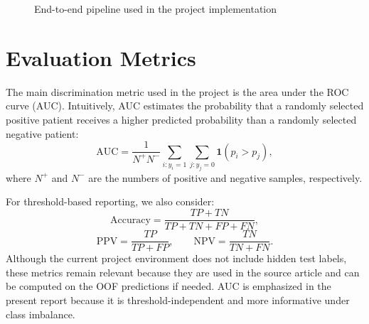\documentclass[a4paper,12pt]{extreport}
\begin{document}
\begin{figure}[H]
    \centering
    \caption{End-to-end pipeline used in the project implementation}
    \label{fig:pipeline}
\end{figure}

\section{Evaluation Metrics}
The main discrimination metric used in the project is the area under the ROC curve (AUC). Intuitively, AUC estimates the probability that a randomly selected positive patient receives a higher predicted probability than a randomly selected negative patient:
\[
\mathrm{AUC} = \frac{1}{N^{+}N^{-}} \sum_{i:y_i=1}\sum_{j:y_j=0}\mathbf{1}(p_i > p_j),
\]
where \(N^{+}\) and \(N^{-}\) are the numbers of positive and negative samples, respectively.

For threshold-based reporting, we also consider:
\[
\mathrm{Accuracy} = \frac{TP + TN}{TP + TN + FP + FN},
\]
\[
\mathrm{PPV} = \frac{TP}{TP + FP}, \qquad
\mathrm{NPV} = \frac{TN}{TN + FN}.
\]
Although the current project environment does not include hidden test labels, these metrics remain relevant because they are used in the source article \cite{li2022prediction} and can be computed on the OOF predictions if needed. AUC is emphasized in the present report because it is threshold-independent and more informative under class imbalance.
\end{document}
